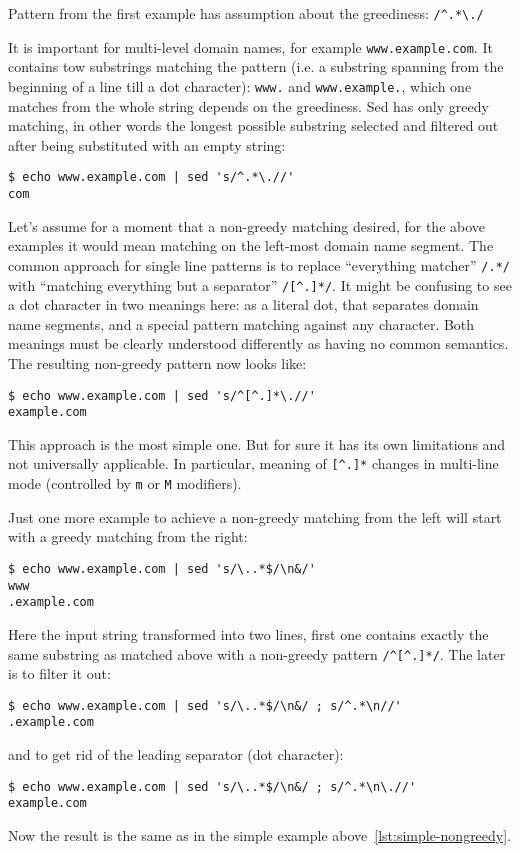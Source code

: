 Pattern from the first example has assumption about the greediness:
\lstinline{/^.*\./}

It is important for multi-level domain names, for example \lstinline{www.example.com}.
It contains tow substrings matching the pattern (i.e. a substring spanning from the
beginning of a line till a dot character):
\lstinline{www.} and \lstinline{www.example.},
which one matches from the whole string depends on the greediness.
Sed has only greedy matching, in other words the longest possible
substring selected and filtered out after being substituted with an empty string:
\begin{lstlisting}[caption={Simple greedy matching}, label={lst:simple-greedy}]
$ echo www.example.com | sed 's/^.*\.//'
com
\end{lstlisting}

Let's assume for a moment that a non-greedy matching desired, for the above
examples it would mean matching on the left-most domain name segment.
The common approach for single line patterns is to replace
``everything matcher'' \lstinline{/.*/} with ``matching everything but
a separator'' \lstinline{/[^.]*/}. It might be confusing to see a dot
character in two meanings here: as a literal dot, that separates domain
name segments, and a special pattern matching against any character.
Both meanings must be clearly understood differently as having no common
semantics. The resulting non-greedy pattern now looks like:
\begin{lstlisting}[caption={Simple non-greedy matching}, label={lst:simple-nongreedy}]
$ echo www.example.com | sed 's/^[^.]*\.//'
example.com
\end{lstlisting}

This approach is the most simple one. But for sure it has its own limitations
and not universally applicable. In particular, meaning of \lstinline{[^.]*}
changes in multi-line mode (controlled by \lstinline{m} or \lstinline{M}
modifiers).

Just one more example to achieve a non-greedy matching from the left will start
with a greedy matching from the right:
\begin{lstlisting}
$ echo www.example.com | sed 's/\..*$/\n&/'
www
.example.com
\end{lstlisting}

Here the input string transformed into two lines, first one contains exactly
the same substring as matched above with a non-greedy pattern
\lstinline{/^[^.]*/}. The later is to filter it out:
\begin{lstlisting}
$ echo www.example.com | sed 's/\..*$/\n&/ ; s/^.*\n//'
.example.com
\end{lstlisting}
and to get rid of the leading separator (dot character):
\begin{lstlisting}
$ echo www.example.com | sed 's/\..*$/\n&/ ; s/^.*\n\.//'
example.com
\end{lstlisting}
Now the result is the same as in the simple example above~\ref{lst:simple-nongreedy}.

